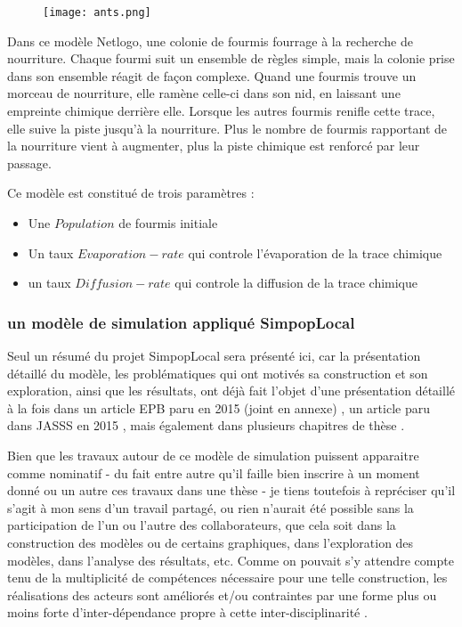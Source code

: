 \begin{figure}[H]
		\centering
	 	\texttt{[image: ants.png]}
\end{figure}

Dans ce modèle Netlogo, une colonie de fourmis fourrage à la recherche de nourriture. Chaque fourmi suit un ensemble de règles simple, mais la colonie prise dans son ensemble réagit de façon complexe. Quand une fourmis trouve un morceau de nourriture, elle ramène celle-ci dans son nid, en laissant une empreinte chimique derrière elle. Lorsque les autres fourmis renifle cette trace, elle suive la piste jusqu'à la nourriture. Plus le nombre de fourmis rapportant de la nourriture vient à augmenter, plus la piste chimique est renforcé par leur passage. 

Ce modèle est constitué de trois paramètres : 
\begin{itemize}[label=\textbullet,noitemsep,nolistsep]
\item Une $Population$ de fourmis initiale
\item Un taux $Evaporation-rate$ qui controle l'évaporation de la trace chimique 
\item un taux $Diffusion-rate$ qui controle la diffusion de la trace chimique
\end{itemize}

\subsubsection{un modèle de simulation appliqué SimpopLocal}

Seul un résumé du projet SimpopLocal sera présenté ici, car la présentation détaillé du modèle, les problématiques qui ont motivés sa construction et son exploration, ainsi que les résultats, ont déjà fait l'objet d'une présentation détaillé à la fois dans un article EPB paru en 2015 \autocite{Schmitt2015} (joint en annexe) , un article paru dans JASSS en 2015 \autocite{Reuillon2015}, mais également dans plusieurs chapitres de thèse \autocite{Schmitt2014}. 

Bien que les travaux autour de ce modèle de simulation puissent apparaitre comme nominatif - du fait entre autre qu'il faille bien inscrire à un moment donné ou un autre ces travaux dans une thèse - je tiens toutefois à repréciser qu'il s'agit à mon sens d'un travail partagé, ou rien n'aurait été possible sans la participation de l'un ou l'autre des collaborateurs, que cela soit dans la construction des modèles ou de certains graphiques, dans l'exploration des modèles, dans l'analyse des résultats, etc. Comme on pouvait s'y attendre compte tenu de la multiplicité de compétences nécessaire pour une telle construction, les réalisations des acteurs sont améliorés et/ou contraintes par une forme plus ou moins forte d'inter-dépendance propre à cette inter-disciplinarité \autocite{Chapron2014}.

